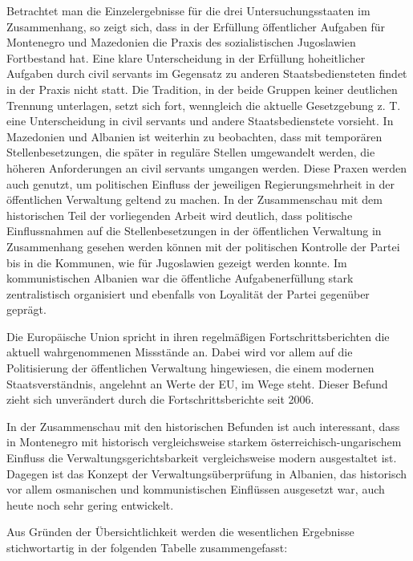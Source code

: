 Betrachtet man die Einzelergebnisse für die drei Untersuchungsstaaten im Zusammenhang, so zeigt sich, dass in der Erfüllung öffentlicher Aufgaben für Montenegro und Mazedonien die Praxis des sozialistischen Jugoslawien Fortbestand hat. Eine klare Unterscheidung in der Erfüllung hoheitlicher Aufgaben durch civil servants im Gegensatz zu anderen Staatsbediensteten findet in der Praxis nicht statt. Die Tradition, in der beide Gruppen keiner deutlichen Trennung unterlagen, setzt sich fort, wenngleich die aktuelle Gesetzgebung z. T. eine Unterscheidung in civil servants und andere Staatsbedienstete vorsieht. In Mazedonien und Albanien ist weiterhin zu beobachten, dass mit temporären Stellenbesetzungen, die später in reguläre Stellen umgewandelt werden, die höheren Anforderungen an civil servants umgangen werden. Diese Praxen werden auch genutzt, um politischen Einfluss der jeweiligen Regierungsmehrheit in der öffentlichen Verwaltung geltend zu machen. In der Zusammenschau mit dem historischen Teil der vorliegenden Arbeit wird deutlich, dass politische Einflussnahmen auf die Stellenbesetzungen in der öffentlichen Verwaltung in Zusammenhang gesehen werden können mit der politischen Kontrolle der Partei bis in die Kommunen, wie für Jugoslawien gezeigt werden konnte. Im kommunistischen Albanien war die öffentliche Aufgabenerfüllung stark zentralistisch organisiert und ebenfalls von Loyalität der Partei gegenüber geprägt. \par
Die Europäische Union spricht in ihren regelmäßigen Fortschrittsberichten die aktuell wahrgenommenen Missstände an. Dabei wird vor allem auf die Politisierung der öffentlichen Verwaltung hingewiesen, die einem modernen Staatsverständnis, angelehnt an Werte der EU, im Wege steht. Dieser Befund zieht sich unverändert durch die Fortschrittsberichte seit 2006.\par
In der Zusammenschau mit den historischen Befunden ist auch interessant, dass in Montenegro mit historisch vergleichsweise starkem österreichisch-ungarischem Einfluss die Verwaltungsgerichtsbarkeit vergleichsweise modern ausgestaltet ist. Dagegen ist das Konzept der Verwaltungsüberprüfung in Albanien, das historisch vor allem osmanischen und kommunistischen Einflüssen ausgesetzt war, auch heute noch sehr gering entwickelt.\par
Aus Gründen der Übersichtlichkeit werden die wesentlichen Ergebnisse stichwortartig in der folgenden Tabelle zusammengefasst:

